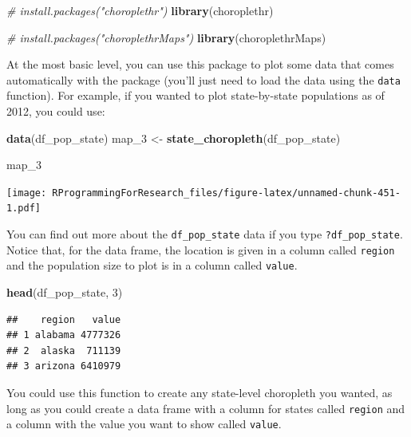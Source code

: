\documentclass[]{book}
\makeatletter
\newenvironment{Shaded}{\begin{snugshade}}{\end{snugshade}}
\newcommand{\KeywordTok}[1]{\textcolor[rgb]{0.13,0.29,0.53}{\textbf{{#1}}}}
\newcommand{\DecValTok}[1]{\textcolor[rgb]{0.00,0.00,0.81}{{#1}}}
\newcommand{\StringTok}[1]{\textcolor[rgb]{0.31,0.60,0.02}{{#1}}}
\newcommand{\CommentTok}[1]{\textcolor[rgb]{0.56,0.35,0.01}{\textit{{#1}}}}
\newcommand{\NormalTok}[1]{{#1}}
\newenvironment{kframe}{%
\medskip{}
\setlength{\fboxsep}{.8em}
 \def\at@end@of@kframe{}%
 \ifinner\ifhmode%
  \def\at@end@of@kframe{\end{minipage}}%
  \begin{minipage}{\columnwidth}%
 \fi\fi%
 \def\FrameCommand##1{\hskip\@totalleftmargin \hskip-\fboxsep
 \colorbox{shadecolor}{##1}\hskip-\fboxsep
     \hskip-\linewidth \hskip-\@totalleftmargin \hskip\columnwidth}%
 \MakeFramed {\advance\hsize-\width
   \@totalleftmargin\z@ \linewidth\hsize
   \@setminipage}}%
 {\par\unskip\endMakeFramed%
 \at@end@of@kframe}
\renewenvironment{Shaded}{\begin{kframe}}{\end{kframe}}
\makeatother
\begin{document}
\begin{Shaded}
\begin{Highlighting}[]
\CommentTok{# install.packages("choroplethr")}
\KeywordTok{library}\NormalTok{(choroplethr)}

\CommentTok{# install.packages("choroplethrMaps")}
\KeywordTok{library}\NormalTok{(choroplethrMaps)}
\end{Highlighting}
\end{Shaded}

At the most basic level, you can use this package to plot some data that
comes automatically with the package (you'll just need to load the data
using the \texttt{data} function). For example, if you wanted to plot
state-by-state populations as of 2012, you could use:

\begin{Shaded}
\begin{Highlighting}[]
\KeywordTok{data}\NormalTok{(df_pop_state)}
\NormalTok{map_3 <-}\StringTok{ }\KeywordTok{state_choropleth}\NormalTok{(df_pop_state)}
\end{Highlighting}
\end{Shaded}

\begin{Shaded}
\begin{Highlighting}[]
\NormalTok{map_3}
\end{Highlighting}
\end{Shaded}

\texttt{[image: RProgrammingForResearch\_files/figure-latex/unnamed-chunk-451-1.pdf]}

You can find out more about the \texttt{df\_pop\_state} data if you type
\texttt{?df\_pop\_state}. Notice that, for the data frame, the location
is given in a column called \texttt{region} and the population size to
plot is in a column called \texttt{value}.

\begin{Shaded}
\begin{Highlighting}[]
\KeywordTok{head}\NormalTok{(df_pop_state, }\DecValTok{3}\NormalTok{)}
\end{Highlighting}
\end{Shaded}

\begin{verbatim}
##    region   value
## 1 alabama 4777326
## 2  alaska  711139
## 3 arizona 6410979
\end{verbatim}

You could use this function to create any state-level choropleth you
wanted, as long as you could create a data frame with a column for
states called \texttt{region} and a column with the value you want to
show called \texttt{value}.
\end{document}
